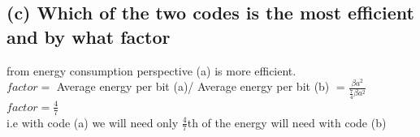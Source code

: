 \documentclass[a4paper,11pt]{article}
\begin{document}
\subsection*{(c) Which of the two codes is the most efficient and by what factor}
from energy consumption perspective (a) is more efficient.\\
$factor =$ Average energy per bit (a)/ Average energy per bit (b) $=\frac{\beta a^2}{\frac{7}{4}\beta a^2}$\\
$factor = \frac{4}{7}$\\
i.e with code (a) we will need only $\frac{4}{7}$th of the energy will need with code  (b)
\end{document}
